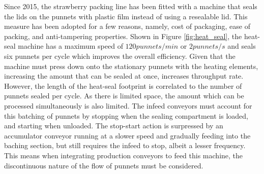 \documentclass[fleqn,twoside]{article}
\begin{document}
Since 2015, the strawberry packing line has been fitted with a machine that seals the lids on the punnets with plastic film instead of using a resealable lid. This measure has been adopted for a few reasons, namely, cost of packaging, ease of packing, and anti-tampering properties. Shown in Figure \ref{fig:heat_seal}, the heat-seal machine has a maximum speed of $120 punnets/min$ or $2 punnets/s$ and seals six punnets per cycle which improves the overall efficiency. Given that the machine must press down onto the stationary punnets with the heating elements, increasing the amount that can be sealed at once, increases throughput rate. However, the length of the heat-seal footprint is correlated to the number of punnets sealed per cycle. As there is limited space, the amount which can be processed simultaneously is also limited. The infeed conveyors must account for this batching of punnets by stopping when the sealing compartment is loaded, and starting when unloaded. The stop-start action is surpressed by an accumulator conveyor running at a slower speed and gradually feeding into the baching section, but still requires the infeed to stop, albeit a lesser frequency. This means when integrating production conveyors to feed this machine, the discontinuous nature of the flow of punnets must be considered.
\end{document}
